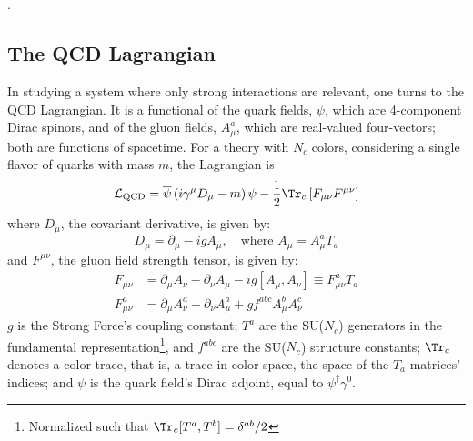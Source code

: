 \chapter{}

.\section{The QCD Lagrangian}

In studying a system where only strong interactions are relevant, one turns to the QCD Lagrangian. It is a functional of the quark fields, $\psi$, which are 4-component Dirac spinors, and of the gluon fields, $A^a_\mu$, which are real-valued four-vectors; both are functions of spacetime. For a theory with $N_c$ colors, considering a single flavor of quarks with mass $m$,
 the Lagrangian is
\begin{equation}
	\mathcal{L}_\text{QCD} = \overline{\psi} \left(i \gamma^\mu D_\mu - m \right) \psi - \frac{1}{2} \Tr_c \left[ F_{\mu \nu} F^{\mu \nu} \right] %
	\label{eq:QCD_Lagrangian}
\end{equation}
where $D_\mu$, the covariant derivative, is given by:
\begin{equation}
	D_\mu =  \partial_\mu - i g A_\mu, \quad \text{where }  A_\mu = A_\mu^a T_a
\end{equation}
and $F^{\mu \nu}$, the gluon field strength tensor, is given by:
\begin{equation}
\begin{split}
	F_{\mu \nu} & = \partial_\mu A_\nu - \partial_\nu A_\mu - ig [A_\mu, A_\nu] \equiv F_{\mu \nu}^a T_a\\
	F_{\mu \nu}^a & = \partial_\mu A_\nu^a - \partial_\nu A_\mu^a + g f^{a b c} A^b_\mu A^c_\nu 
\end{split}
\end{equation}
$g$ is the Strong Force's coupling constant; $T^a$ are the SU($N_c$) generators in the fundamental representation\footnote{Normalized such that $\Tr_c [T^a, T^b] = \delta^{ab}/2$}, and $f^{abc}$ are the SU($N_c$) structure constants; $\Tr_c$ denotes a color-trace, that is, a trace in color space, the space of the $T_a$ matrices' indices; and $\overline{\psi}$ is the quark field's Dirac adjoint, equal to $ \psi^\dagger \gamma^0$.

